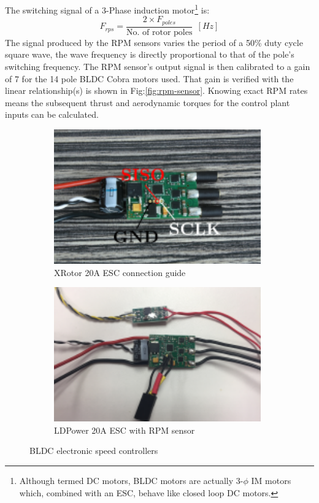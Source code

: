 The switching signal of a 3-Phase induction motor\footnote{Although termed DC motors, BLDC motors are actually 3-$\phi$ IM motors which, combined with an ESC, behave like closed loop DC motors.} is\cite{vfd}:
\begin{equation}
F_{rps}=\frac{2\times F_{poles}}{\text{No. of rotor poles}}~~[Hz]
\end{equation}
The signal produced by the RPM sensors varies the period of a 50\% duty cycle square wave, the wave frequency is directly proportional to that of the pole's switching frequency. The RPM sensor's output signal is then calibrated to a gain of 7 for the 14 pole BLDC Cobra motors used. That gain is verified with the linear relationship(s) is shown in Fig:\ref{fig:rpm-sensor}. Knowing exact RPM rates means the subsequent thrust and aerodynamic torques for the control plant inputs can be calculated.
\par
\begin{figure}[hbtp]
\begin{subfigure}{0.5\textwidth}
\centering
\includegraphics[width=0.98\textwidth]{figs/xrotor-20A}
\caption{XRotor 20A ESC connection guide\cite{xrotor}}
\label{fig:xrotor-20A}
\end{subfigure}
\begin{subfigure}{0.5\textwidth}
\centering
\includegraphics[width=0.98\textwidth]{figs/ldpower-20A}
\caption{LDPower 20A ESC with RPM sensor}
\label{fig:ldpower-20A}
\end{subfigure}
\caption{BLDC electronic speed controllers}
\end{figure}
